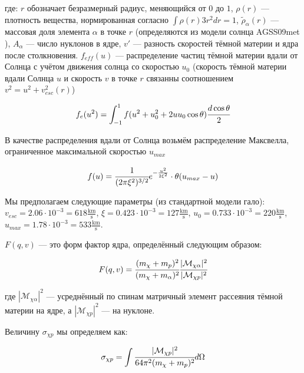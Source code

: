 где: $r$ обозначает безразмерный радиус, меняющийся от $0$ до $1$, $\rho(r)$ --- плотность вещества, нормированная согласно $\int \rho(r) 3r^2 dr = 1$, $\tilde{\rho}_{\alpha}(r)$ --- массовая доля элемента $\alpha$ в точке $r$ (определяются из модели солнца AGSS09met \cite{SolarModel_2017}), $A_{\alpha}$ --- число нуклонов в ядре, $v'$ --- разность скоростей тёмной материи и ядра после столкновения. $f_{eff}(u)$ --- распределение частиц тёмной материи вдали от Солнца с учётом движения солнца со скоростью $u_0$ (скорость тёмной материи вдали Солнца $u$ и скорость $v$ в точке $r$ связанны соотношением $v^2 = u^2 + v_{esc}^2(r)$)

\begin{equation}
	f_e(u^2) = \int_{-1}^1 {f(u^2+u^2_0 + 2 u u_0 \cos{\theta}) \cfrac{d\cos{\theta}}{2}}
\end{equation}

В качестве распределения вдали от Солнца возьмём распределение Максвелла, ограниченное максимальной скоростью $u_{max}$

\begin{equation}
	f(u)  = \cfrac{1}{(2\pi \xi^2)^{3/2}} e^{-\frac{u^2}{2 \xi^2}} \cdot \theta(u_{max} - u )
\end{equation}

Мы предполагаем следующие параметры (из стандартной модели гало):
$v_{esc} = 2.06 \cdot 10^{-3} = 618 \frac{\text{km}}{\text{s}}$, $\xi = 0.423 \cdot 10^{-3} = 127 \frac{\text{km}}{\text{s}}$, $u_0 = 0.733 \cdot 10^{-3} = 220 \frac{\text{km}}{\text{s}}$, $u_{max} = 1.78 \cdot 10^{-3} = 533 \frac{\text{km}}{\text{s}}$.

$F(q,v)$ --- это форм фактор ядра, определённый следующим образом:

\begin{equation}
	\label{eq::ff_def}
	F(q,v) = \cfrac{(m_{\chi} + m_{p})^2}{(m_{\chi} + m_{\alpha})^2}
	\cfrac{|\mathcal{M}_{\chi \alpha}|^2}
	{|\mathcal{M}_{\chi p}|^2}
\end{equation}

где $|\mathcal{M}_{\chi \alpha}|^2$ --- усреднённый по спинам матричный элемент рассеяния тёмной материи на ядре, а $|\mathcal{M}_{\chi p}|^2$ --- на нуклоне.

Величину $\sigma_{\chi p}$ мы определяем как:

\begin{equation}
	\label{eq:sigma_def}
	\sigma_{\chi p} = \int {\cfrac{|\mathcal{M}_{\chi p}|^2}{64\pi^2 (m_{\chi} + m_p)^2} d\Omega}
\end{equation}



